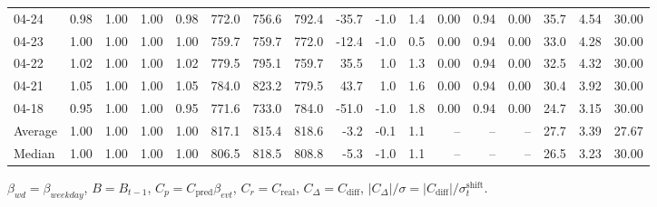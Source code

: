 \begin{threeparttable}
{\begin{tabular}{lrrrrrrrrrrrrrrrr}
  04-24 &         0.98 &           1.00 &          1.00 &          0.98 & 772.0 & 756.6 & 792.4 &      -35.7 &                     -1.0 &                 1.4 &       0.00 &      0.94 &           0.00 &             35.7 &            4.54 &                  30.00 \\
  04-23 &         1.00 &           1.00 &          1.00 &          1.00 & 759.7 & 759.7 & 772.0 &      -12.4 &                     -1.0 &                 0.5 &       0.00 &      0.94 &           0.00 &             33.0 &            4.28 &                  30.00 \\
  04-22 &         1.02 &           1.00 &          1.00 &          1.02 & 779.5 & 795.1 & 759.7 &       35.5 &                      1.0 &                 1.3 &       0.00 &      0.94 &           0.00 &             32.5 &            4.32 &                  30.00 \\
  04-21 &         1.05 &           1.00 &          1.00 &          1.05 & 784.0 & 823.2 & 779.5 &       43.7 &                      1.0 &                 1.6 &       0.00 &      0.94 &           0.00 &             30.4 &            3.92 &                  30.00 \\
  04-18 &         0.95 &           1.00 &          1.00 &          0.95 & 771.6 & 733.0 & 784.0 &      -51.0 &                     -1.0 &                 1.8 &       0.00 &      0.94 &           0.00 &             24.7 &            3.15 &                  30.00 \\
Average &         1.00 &           1.00 &          1.00 &          1.00 & 817.1 & 815.4 & 818.6 &       -3.2 &                     -0.1 &                 1.1 &         -- &        -- &             -- &             27.7 &            3.39 &                  27.67 \\
 Median &         1.00 &           1.00 &          1.00 &          1.00 & 806.5 & 818.5 & 808.8 &       -5.3 &                     -1.0 &                 1.1 &         -- &        -- &             -- &             26.5 &            3.23 &                  30.00 \\
\bottomrule
\end{tabular}
}
\begin{tablenotes}\footnotesize
\item $\beta_{wd}=\beta_{weekday}$, $B=B_{t-1}$,
$C_p=C_{\text{pred}}\beta_{evt}$, $C_r=C_{\text{real}}$,
$C_\Delta=C_{\text{diff}}$, $|C_\Delta|/\sigma=|C_{\text{diff}}|/\sigma_t^{\text{shift}}$.
\end{tablenotes}
\end{threeparttable}
\endgroup
